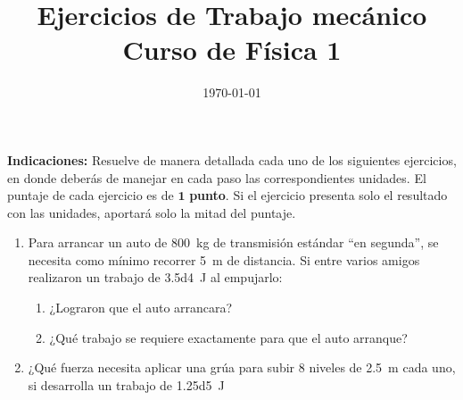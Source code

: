 \documentclass[14pt]{extarticle}
\title{\vspace*{-2cm} Ejercicios de Trabajo mecánico \\ Curso de Física 1\vspace{-5ex}}
\date{\today}
\begin{document}
\maketitle

\textbf{Indicaciones:} Resuelve de manera detallada cada uno de los siguientes ejercicios, en donde deberás de manejar en cada paso las correspondientes unidades. El puntaje de cada ejercicio es de $\mathbf{1}$ \textbf{punto}. Si el ejercicio presenta solo el resultado con las unidades, aportará solo la mitad del puntaje.

\begin{enumerate}
\item Para arrancar un auto de \SI{800}{\kilo\gram} de transmisión estándar \enquote{en segunda}, se necesita como mínimo recorrer \SI{5}{\meter} de distancia. Si entre varios amigos realizaron un trabajo de \SI{3.5d4}{\joule} al empujarlo:
\begin{enumerate}
\item ¿Lograron que el auto arrancara?
\item ¿Qué trabajo se requiere exactamente para que el auto arranque?
\end{enumerate}
\item ¿Qué fuerza necesita aplicar una grúa para subir $8$ niveles de \SI{2.5}{\meter} cada uno, si desarrolla un trabajo de \SI{1.25d5}{\joule}
\end{enumerate}
\end{document}
